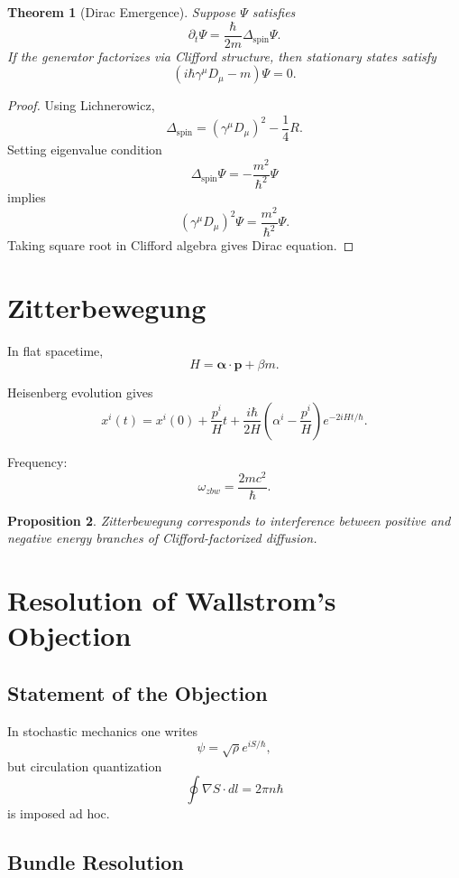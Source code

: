 \documentclass[11pt]{article}
\newtheorem{theorem}{Theorem}[section]
\newtheorem{proposition}[theorem]{Proposition}
\theoremstyle{remark}
\begin{document}
\begin{theorem}[Dirac Emergence]
Suppose $\Psi$ satisfies
\[
\partial_t \Psi = \frac{\hbar}{2m}\Delta_{\text{spin}}\Psi.
\]
If the generator factorizes via Clifford structure, then stationary states satisfy
\[
(i\hbar \gamma^\mu D_\mu - m)\Psi = 0.
\]
\end{theorem}

\begin{proof}
Using Lichnerowicz,
\[
\Delta_{\text{spin}} = (\gamma^\mu D_\mu)^2 - \frac14 R.
\]
Setting eigenvalue condition
\[
\Delta_{\text{spin}}\Psi = -\frac{m^2}{\hbar^2}\Psi
\]
implies
\[
(\gamma^\mu D_\mu)^2\Psi = \frac{m^2}{\hbar^2}\Psi.
\]
Taking square root in Clifford algebra gives Dirac equation.
\end{proof}

\section{Zitterbewegung}

In flat spacetime,
\[
H = \bm{\alpha}\cdot \bm{p} + \beta m.
\]

Heisenberg evolution gives
\[
x^i(t) = x^i(0) + \frac{p^i}{H}t + \frac{i\hbar}{2H}(\alpha^i - \frac{p^i}{H})e^{-2iHt/\hbar}.
\]

Frequency:
\[
\omega_{zbw} = \frac{2mc^2}{\hbar}.
\]

\begin{proposition}
Zitterbewegung corresponds to interference between positive and negative energy branches of Clifford-factorized diffusion.
\end{proposition}

\section{Resolution of Wallstrom’s Objection}

\subsection{Statement of the Objection}

In stochastic mechanics one writes
\[
\psi = \sqrt{\rho}e^{iS/\hbar},
\]
but circulation quantization
\[
\oint \nabla S \cdot dl = 2\pi n\hbar
\]
is imposed ad hoc.

\subsection{Bundle Resolution}
\end{document}
